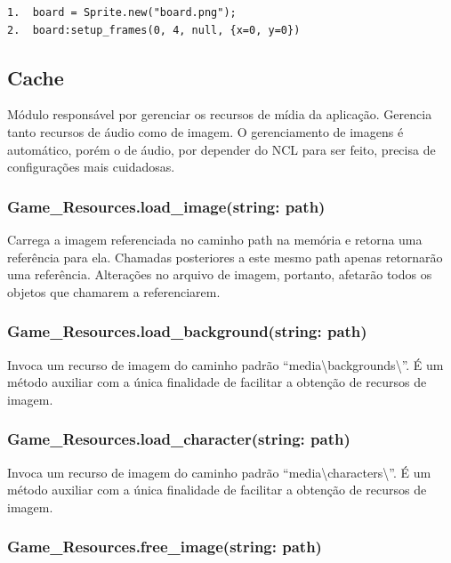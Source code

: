\documentclass[
	12pt,				%
	openright,			%
	oneside,			%
	a4paper,			%
	brazil,				%
	]{abntex2}
\begin{document}
\begin{lstlisting}[caption={Exemplo de uso da função setup\_frames},label=cod_sprite_2,frame=single]
1.	board = Sprite.new("board.png");
2.	board:setup_frames(0, 4, null, {x=0, y=0})
\end{lstlisting}

\subsection{Cache}

Módulo responsável por gerenciar os recursos de mídia da aplicação. Gerencia tanto recursos de áudio como de imagem. O gerenciamento de imagens é automático, porém o de áudio, por depender do NCL para ser feito, precisa de configurações mais cuidadosas.

\subsubsection{Game\_Resources.load\_image(string: path)}

Carrega a imagem referenciada no caminho path na memória e retorna uma referência para ela. Chamadas posteriores a este mesmo path apenas retornarão uma referência. Alterações no arquivo de imagem, portanto, afetarão todos os objetos que chamarem a referenciarem.

\subsubsection{Game\_Resources.load\_background(string: path)}

Invoca um recurso de imagem do caminho padrão “media\textbackslash backgrounds\textbackslash”. É um método auxiliar com a única finalidade de facilitar a obtenção de recursos de imagem.

\subsubsection{Game\_Resources.load\_character(string: path)}

Invoca um recurso de imagem do caminho padrão “media\textbackslash characters\textbackslash”. É um método auxiliar com a única finalidade de facilitar a obtenção de recursos de imagem.

\subsubsection{Game\_Resources.free\_image(string: path)}
\end{document}
